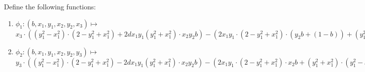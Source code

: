 Define the following functions:
\begin{enumerate}
    \item $\phi_1: (b, x_1, y_1, x_2, y_2, x_3) \mapsto $ \\
        $x_3 \cdot ((y_1^2 - x_1^2)\cdot(2 - y_1^2 + x_1^2) + 2dx_1y_1(y_1^2+x_1^2) \cdot x_2y_2b ) - (2x_1y_1\cdot(2 - y_1^2 +x_1^2)\cdot (y_2b + (1 - b)) + (y_1^2 + x_1^2)\cdot(y_1^2 - x_1^2)\cdot x_2 b)$

    \item $\phi_2: (b, x_1, y_1, x_2, y_2, y_3) \mapsto $ \\
        $y_3 \cdot ((y_1^2 - x_1^2)\cdot(2 - y_1^2 + x_1^2) - 2dx_1y_1(y_1^2+x_1^2) \cdot x_2y_2b ) - (2x_1y_1\cdot(2 - y_1^2 +x_1^2)\cdot x_2b + (y_1^2 + x_1^2)\cdot(y_1^2 - x_1^2)\cdot (y_2b + (1 - b)))$
\end{enumerate}

